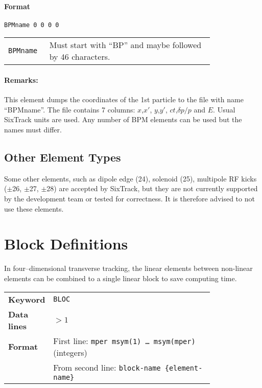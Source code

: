 \paragraph{Format} \texttt{BPMname 0 0 0 0}

\bigskip
\begin{tabular}{@{}lp{0.8\linewidth}}
    \texttt{BPMname} & Must start with ``BP'' and maybe followed by 46 characters.
\end{tabular}

\paragraph{Remarks:}
This element dumps the coordinates of the 1st particle to the file with name ``BPMname''.
The file contains 7 columns: $x$,$x'$, $y$,$y'$, $ct$,$\delta p/p$ and $E$.
Usual SixTrack units are used.
Any number of BPM elements can be used but the names must differ. 

\subsection{Other Element Types}

Some other elements, such as dipole edge (24), solenoid (25), multipole RF kicks ($\pm$26, $\pm$27, $\pm$28) are accepted by SixTrack, but they are not currently supported by the development team or tested for correctness.
It is therefore advised to not use these elements.

\section{Block Definitions} \label{BloDef}

In four--dimensional transverse tracking, the linear elements between non-linear elements can be combined to a single linear block to save computing time.

\bigskip
\begin{tabular}{@{}lp{0.8\linewidth}}
    \textbf{Keyword}    & \texttt{BLOC} \\
    \textbf{Data lines} & $>1$ \\
    \textbf{Format}     & First line: \texttt{mper msym(1) \dots~msym(mper)} (integers) \\
                        & From second line: \texttt{block-name \{element-name\}}
\end{tabular}

